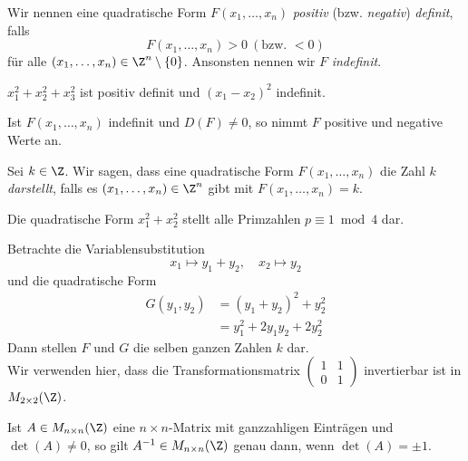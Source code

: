 \begin{defn*}
	Wir nennen eine quadratische Form $F(x_1,\dotsc,x_n)$ \emph{positiv} (bzw. \emph{negativ}) \emph{definit}, falls
	\[ F(x_1,\dotsc,x_n) > 0 \ (\text{bzw. }<0) \]
	für alle $(x_1,\dotsc,x_n) \in \Z^n \setminus \{0\}$. Ansonsten nennen wir $F$ \emph{indefinit}.
\end{defn*}

\begin{exmp*}
	$x_1^2 + x_2^2 + x_3^2$ ist positiv definit und $(x_1-x_2)^2$ indefinit.
\end{exmp*}

\begin{rem*}
	Ist $F(x_1,\dotsc,x_n)$ indefinit und $D(F) \neq 0$, so nimmt $F$ positive und negative Werte an.
\end{rem*}

\begin{defn*}
	Sei $k \in \Z$. Wir sagen, dass eine quadratische Form $F(x_1,\dotsc,x_n)$ die Zahl $k$ \emph{darstellt}, falls es $(x_1,\dotsc,x_n) \in \Z^n$ gibt mit $F(x_1,\dotsc,x_n) = k$.
\end{defn*}

\begin{exmp*}
	Die quadratische Form $x_1^2+x_2^2$ stellt alle Primzahlen $p \equiv 1 \bmod 4$ dar.
\end{exmp*}

\begin{idee*}
	Betrachte die Variablensubstitution
	\[ x_1 \mapsto y_1 + y_2, \quad x_2 \mapsto y_2 \]
	und die quadratische Form
	\begin{align*}
		G(y_1,y_2) &= (y_1+y_2)^2 + y_2^2\\
		&= y_1^2 + 2y_1y_2 + 2y_2^2
	\end{align*}
	Dann stellen $F$ und $G$ die selben ganzen Zahlen $k$ dar.\\
	Wir verwenden hier, dass die Transformationsmatrix $\begin{pmatrix}
		1&1\\0&1
	\end{pmatrix}$ invertierbar ist in $M_{2 \times 2}(\Z)$.
\end{idee*}

\begin{rem*}
	Ist $A \in M_{n \times n}(\Z)$ eine $n \times n$-Matrix mit ganzzahligen Einträgen und $\det(A) \neq 0$, so gilt $A^{-1} \in M_{n \times n}(\Z)$ genau dann, wenn $\det(A) = \pm 1$.
\end{rem*}

